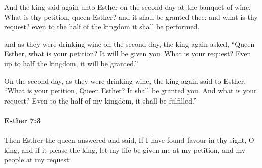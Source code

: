 			\begin{versebox}
					\item[BHS] 
					\item[LXX] 
					\item[ASV] And the king said again unto Esther on the second day at the banquet of wine, What is thy petition, queen Esther? and it shall be granted thee: and what is thy request? even to the half of the kingdom it shall be performed.
					\item[NIV] and as they were drinking wine on the second day, the king again asked, “Queen Esther, what is your petition? It will be given you. What is your request? Even up to half the kingdom, it will be granted.”
					\item[NRSV] On the second day, as they were drinking wine, the king again said to Esther, “What is your petition, Queen Esther? It shall be granted you. And what is your request? Even to the half of my kingdom, it shall be fulfilled.”
			\end{versebox}

		\paragraph{Esther 7:3} %
			\label{ESTHER-7-3}

			Then Esther the queen answered and said, If I have found favour in thy sight, O king, and if it please the king, let my life be given me at my petition, and my people at my request:

